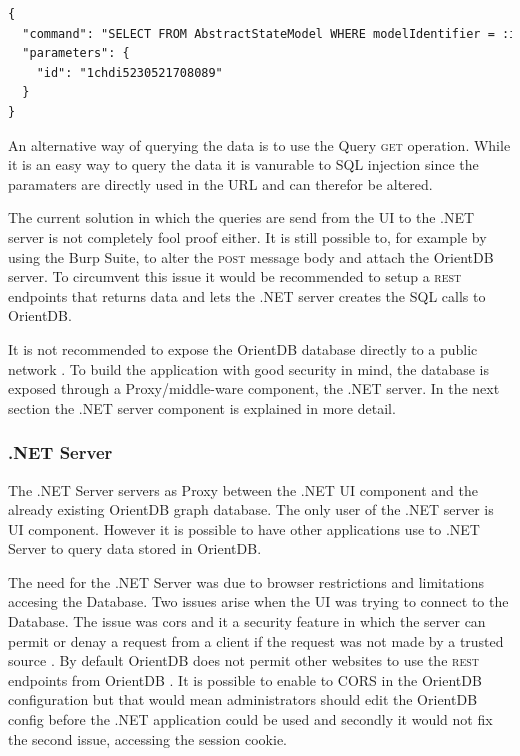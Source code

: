\begin{lstlisting}[language=xml, caption=Get AbstractStateModel by the model identifier, label=code:example-body]
{
  "command": "SELECT FROM AbstractStateModel WHERE modelIdentifier = :id",
  "parameters": {
    "id": "1chdi5230521708089"
  }
}
\end{lstlisting}

An alternative way of querying the data is to use the Query \textsc{get} operation. While it is an easy way to query the data it is vanurable to SQL injection since the paramaters are directly used in the URL and can therefor be altered.

The current solution in which the queries are send from the UI to the .NET server is not completely fool proof either. It is still possible to, for example by using the Burp Suite, to alter the \textsc{post} message body and attach the OrientDB server. To circumvent this issue it would be recommended to setup a \textsc{rest} endpoints that returns data and lets the .NET server creates the SQL calls to OrientDB. 

It is not recommended to expose the OrientDB database directly to a public network \cite{orientdb-security}. To build the application with good security in mind, the database is exposed through a Proxy/middle-ware component, the .NET server. In the next section the .NET server component is explained in more detail.

\subsubsection{.NET Server}

The .NET Server servers as Proxy between the .NET UI component and the already existing OrientDB graph database. The only user of the .NET server is UI component. However it is possible to have other applications use to .NET Server to query data stored in OrientDB. 

The need for the .NET Server was due to browser restrictions and limitations accesing the Database. Two issues arise when the UI was trying to connect to the Database. The issue was \acrfull{cors} and it a security feature in which the server can permit or denay a request from a client if the request was not made by a trusted source \cite{cors}. By default OrientDB does not permit other websites to use the \textsc{rest} endpoints from OrientDB \cite{orientdb-webserver}. It is possible to enable to CORS in the OrientDB configuration but that would mean administrators should edit the OrientDB config before the .NET application could be used and secondly it would not fix the second issue, accessing the session cookie.

